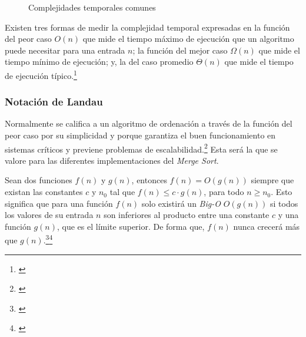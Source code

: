 \documentclass[titlepage]{article}
\begin{document}
\begin{figure}[h]
\begin{minipage}{0.49\textwidth}
			\label{fig:timeComplexities}
			\caption{Complejidades temporales comunes}
		\end{minipage}
	\end{figure}

Existen tres formas de medir la complejidad temporal expresadas en la función del peor caso \(O(n)\) que mide el tiempo máximo de ejecución que un algoritmo puede necesitar para una entrada $n$; la función del mejor caso \(\Omega(n)\) que mide el tiempo mínimo de ejecución; y, la del caso promedio \(\Theta(n)\) que mide el tiempo de ejecución típico.\footnote{\cite{levitin2012introduction}}

\subsubsection{Notación de Landau}%
Normalmente se califica a un algoritmo de ordenación a través de la función del peor caso por su simplicidad y porque garantiza el buen funcionamiento en sistemas críticos y previene problemas de escalabilidad.\footnote{\cite{Correa2024}} Esta será la que se valore para las diferentes implementaciones del \textit{Merge Sort}.

 Sean dos funciones \(f(n)\) y \(g(n)\), entonces \(f(n) = O(g(n))\) siempre que existan las constantes \(c\) y \(n_0\) tal que \(f(n) \leq c\cdot g(n)\), para todo \(n \geq n_0\). Esto significa que para una función \(f(n)\) solo existirá un \textit{Big-O} \(O(g(n))\) si todos los valores de su entrada \(n\) son inferiores al producto entre una constante \(c\) y una función \(g(n)\), que es el límite superior. De forma que, \(f(n)\) nunca crecerá más que \(g(n)\).\footnote{\cite{Sipser1997}}\footnote{\cite{landau-1909}}

\end{document}
